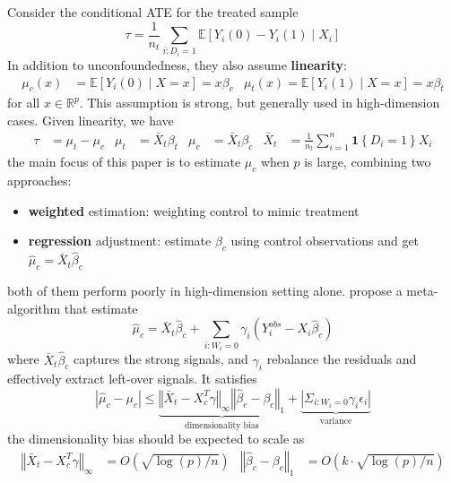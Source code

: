 \documentclass[twoside]{article}
\begin{document}
Consider the conditional ATE for the treated sample
\begin{equation*}
    \tau = \frac{1}{n_t} \sum_{i:D_i=1} \mathbb{E}\left[Y_i(0)-Y_i(1)\mid X_i\right]
\end{equation*}
In addition to unconfoundedness, they also assume \textbf{linearity}:
\begin{align*}
\mu_c(x) &= \mathbb{E}\left[Y_i(0)\mid X=x\right] = x\beta_c & \mu_t(x) = \mathbb{E}\left[Y_i(1)\mid X=x\right] = x\beta_t
\end{align*}
for all $x\in \mathbb{R}^p$. This assumption is strong, but generally used in high-dimension cases. Given linearity, we have 
\begin{align*}
    \tau &=\mu_t-\mu_c & \mu_t &=\bar{X}_t\beta_t & \mu_c&=\bar{X}_t\beta_c &\bar{X}_t &= \frac{1}{n_t}\sum^n_{i=1}\mathbf{1}\left\{D_i=1\right\}X_i
\end{align*}
the main focus of this paper is to estimate $\mu_c$ when $p$ is large, combining two approaches:
\begin{itemize}
    \item \textbf{weighted} estimation: weighting control to mimic treatment
    \item \textbf{regression} adjustment: estimate $\beta_c$ using control observations and get $\hat{\mu}_c=\bar{X}_t\hat{\beta}_c$
\end{itemize}
both of them perform poorly in high-dimension setting alone. \citet{athey2018approximate} propose a meta-algorithm that estimate 
\begin{equation*}
    \hat{\mu}_c = \bar{X}_t \hat{\beta}_c + \sum_{i:W_i=0}\gamma_i \left(Y_i^{obs}-X_i\hat{\beta}_c\right)
\end{equation*}
where $\bar{X}_t \hat{\beta}_c$ captures the strong signals, and $\gamma_i$ rebalance the residuals and effectively extract left-over signals. It satisfies 
\begin{equation*}
    \left\vert \hat{\mu}_c-\mu_c \right\vert \leq \underbrace{\left\Vert \bar{X}_t-X^T_c\gamma \right\Vert _{\infty}\left\Vert \hat{\beta}_c-\beta_c \right\Vert _1}_{\text{dimensionality bias}} + \underbrace{\left\vert \Sigma_{i:W_i=0}\gamma_i\epsilon_i \right\vert}_{\text{variance}} 
\end{equation*}
the dimensionality bias should be expected to scale as 
\begin{align*}
    \left\Vert \bar{X}_t-X^T_c\gamma \right\Vert _{\infty} &=O\left(\sqrt{\log (p)/n}\right) & \left\Vert \hat{\beta}_c-\beta_c \right\Vert _1 &=O\left(k\cdot \sqrt{\log (p)/n} \right)
\end{align*}
\end{document}
